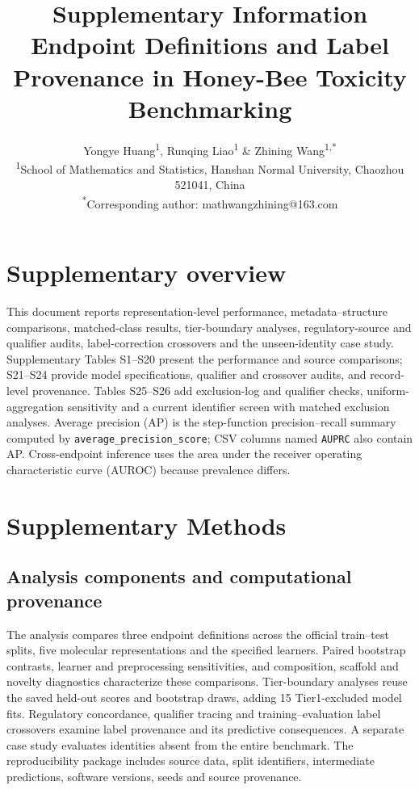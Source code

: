 \documentclass[10pt]{article}
\title{Supplementary Information\\[3pt]\large Endpoint Definitions and Label Provenance in Honey-Bee Toxicity Benchmarking}
\author{Yongye Huang\textsuperscript{1}, Runqing Liao\textsuperscript{1} \& Zhining Wang\textsuperscript{1,*}\\[2pt]
\small\textsuperscript{1}School of Mathematics and Statistics, Hanshan Normal University, Chaozhou 521041, China\\
\small\textsuperscript{*}Corresponding author: mathwangzhining@163.com}
\date{}
\begin{document}
\maketitle

\section*{Supplementary overview}
This document reports representation-level performance, metadata--structure comparisons, matched-class results, tier-boundary analyses, regulatory-source and qualifier audits, label-correction crossovers and the unseen-identity case study. Supplementary Tables S1--S20 present the performance and source comparisons; S21--S24 provide model specifications, qualifier and crossover audits, and record-level provenance. Tables S25--S26 add exclusion-log and qualifier checks, uniform-aggregation sensitivity and a current identifier screen with matched exclusion analyses. Average precision (AP) is the step-function precision--recall summary computed by \texttt{average\_precision\_score}; CSV columns named \texttt{AUPRC} also contain AP. Cross-endpoint inference uses the area under the receiver operating characteristic curve (AUROC) because prevalence differs.

\section*{Supplementary Methods}

\subsection*{Analysis components and computational provenance}
The analysis compares three endpoint definitions across the official train--test splits, five molecular representations and the specified learners. Paired bootstrap contrasts, learner and preprocessing sensitivities, and composition, scaffold and novelty diagnostics characterize these comparisons. Tier-boundary analyses reuse the saved held-out scores and bootstrap draws, adding 15 Tier1-excluded model fits. Regulatory concordance, qualifier tracing and training--evaluation label crossovers examine label provenance and its predictive consequences. A separate case study evaluates identities absent from the entire benchmark. The reproducibility package includes source data, split identifiers, intermediate predictions, software versions, seeds and source provenance.
\end{document}

